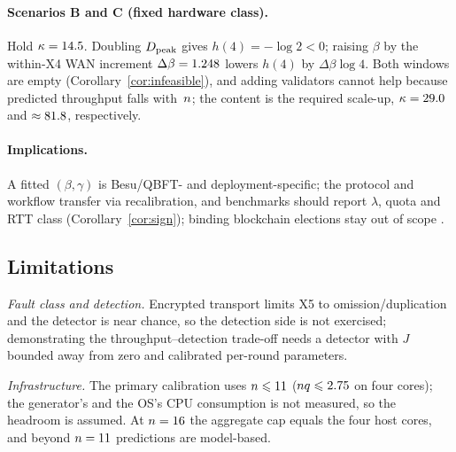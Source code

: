 \paragraph{Scenarios B and C (fixed hardware class).}
Hold $\kappa=14.5$. Doubling $D_{\mathrm{peak}}$ gives $h(4)=-\log2<0$; raising
$\beta$ by the within-X4 WAN increment $\Delta\beta=1.248$ lowers
$h(4)$ by $\Delta\beta\log4$. Both windows are empty
(Corollary~\ref{cor:infeasible}), and adding validators cannot help because
predicted throughput falls with~$n$; the content is the required scale-up,
$\kappa=29.0$ and $\approx81.8$, respectively.

\paragraph{Implications.}
A fitted $(\beta,\gamma)$ is Besu/QBFT- and deployment-specific; the \RNM{}
protocol and workflow transfer via recalibration, and benchmarks should report
$\lambda$, quota and RTT class (Corollary~\ref{cor:sign}); binding blockchain
elections stay out of scope \cite{springall2014,specter2020,park2021}.

\subsection{Limitations}
\label{sec:limitations}

\emph{Fault class and detection.} Encrypted transport limits X5 to
omission/duplication and the detector is near chance, so the detection side is
not exercised; demonstrating the throughput--detection trade-off needs a
detector with $J$ bounded away from zero and calibrated per-round parameters.

\emph{Infrastructure.} The primary calibration uses $n\leqslant11$
($nq\leqslant2.75$ on four cores); the generator's and the OS's CPU
consumption is not measured, so the headroom is assumed. At $n=16$
the aggregate cap equals the four host cores, and beyond $n=11$
predictions are model-based.
